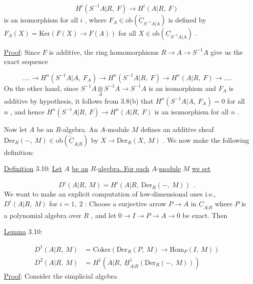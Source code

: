 \begin{equation*}
H^{i}(S^{-1}A|R,\ F) \rightarrow H^{i}(A|R,\ F)
\end{equation*}
is an isomorphism for all  $i$  , where  $F_{A} \in \mathrm{ob}\!\left(\widetilde{\underline{C}}_{S^{-1}A|A}\right)$  is defined by $F_{A}(X) = \mathrm{Ker}(F(X) \rightarrow F(A))$  for all  $X \in \mathrm{ob}\!\left(\underline{C}_{S^{-1}A|A}\right)$  .

\underline{Proof}:  Since  $F$  is additive, the ring homomorphisms  $R \rightarrow A \rightarrow S^{-1}A$  give us the exact sequence

\begin{equation*}
.... \rightarrow H^{n}(S^{-1}A|A,\ F_{A}) \rightarrow H^{n}(S^{-1}A|R,\ F) \rightarrow H^{n}(A|R,\ F) \rightarrow ....
\end{equation*}
On the other hand, since  $S^{-1}A\underset{A}{\otimes}S^{-1}A \rightarrow S^{-1}A$  is an isomorphism and  $F_{A}$  is additive by hypothesis, it follows from 3.8(b) that  $H^{n}(S^{-1}A|A,\ F_{A}) = 0$  for all  $n$  , and hence  $H^{n}(S^{-1}A|R,\ F) \rightarrow H^{n}(A|R,\ F)$  is an isomorphism for all  $n$  .



Now let  $A$  be an $R$-algebra. An $A$-module  $M$  defines an additive sheaf $\mathrm{Der}_R(-,\ M) \in \mathrm{ob}(\widetilde{\underline{C}}_{A|R})$  by  $X \to \mathrm{Der}_R(X,\ M)$  . We now make the following definition:


\underline{Definition} 3.10:  \underline{Let}  $A$  \underline{be an} $R$-\underline{algebra. For each} $A$-\underline{module}  $M$  \underline{we set}

\begin{equation*}
D^i(A|R,\ M) = H^i(A|R,\ \mathrm{Der}_R(-,\ M)) \ \ .
\end{equation*}
We want to make an explicit computation of low-dimensional ones i.e., $D^i(A|R,\ M)$  for  $i = 1,\ 2$  : Choose a surjective arrow  $P \to A$  in  $\underline{C}_{A|R}$  where  $P$  is a polynomial algebra over  $R$  , and let  $0 \to I \to P \to A \to 0$  be exact. Then


\underline{Lemma} 3.10:

\begin{equation*}
\begin{aligned}
D^1(A|R,\ M) &= \mathrm{Coker}(\mathrm{Der}_R(P,\ M) \to \mathrm{Hom}_P(I,\ M)) \\
D^2(A|R,\ M) &= H^1(A|R,\ \underline{H}^1_{A|R}(\mathrm{Der}_R(-,\ M)))
\end{aligned}
\end{equation*}
\underline{Proof}:  Consider the simplicial algebra

